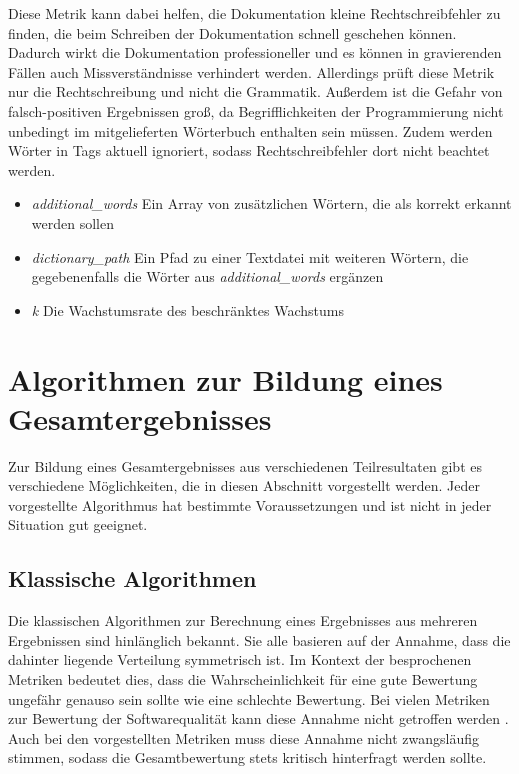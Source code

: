  Diese Metrik kann dabei helfen, die Dokumentation kleine Rechtschreibfehler zu finden, die beim Schreiben der Dokumentation schnell geschehen können. Dadurch wirkt die Dokumentation professioneller und es können in gravierenden Fällen auch Missverständnisse verhindert werden. Allerdings prüft diese Metrik nur die Rechtschreibung und nicht die Grammatik. Außerdem ist die Gefahr von falsch-positiven Ergebnissen groß, da Begrifflichkeiten der Programmierung nicht unbedingt im mitgelieferten Wörterbuch enthalten sein müssen. Zudem werden Wörter in Tags aktuell ignoriert, sodass Rechtschreibfehler dort nicht beachtet werden. 
 \begin{itemize}
    \item \textit{additional\_words} Ein Array von zusätzlichen Wörtern, die als korrekt erkannt werden sollen
     \item
    \textit{dictionary\_path} Ein Pfad zu einer Textdatei mit weiteren Wörtern, die gegebenenfalls die Wörter aus \textit{additional\_words} ergänzen
    \item \textit{k} Die Wachstumsrate des beschränktes Wachstums
   
  
 \end{itemize}  
 \section{Algorithmen zur Bildung eines Gesamtergebnisses}
Zur Bildung eines Gesamtergebnisses aus verschiedenen Teilresultaten gibt es verschiedene Möglichkeiten, die in diesen Abschnitt vorgestellt werden. Jeder vorgestellte Algorithmus hat bestimmte Voraussetzungen und ist nicht in jeder Situation gut geeignet.

\subsection{Klassische Algorithmen}
Die klassischen Algorithmen zur Berechnung eines Ergebnisses aus mehreren Ergebnissen sind hinlänglich bekannt. Sie alle basieren auf der Annahme, dass die dahinter liegende Verteilung symmetrisch ist. Im Kontext der besprochenen Metriken bedeutet dies, dass die Wahrscheinlichkeit für eine gute Bewertung ungefähr genauso sein sollte wie eine schlechte Bewertung. Bei vielen Metriken zur Bewertung der Softwarequalität kann diese Annahme nicht getroffen werden \cite[S. 313]{Youcantcontroltheunfamiliar:Astudyontherelationsbetweenaggregationtechniquesforsoftwaremetrics}. Auch bei den vorgestellten Metriken muss diese Annahme nicht zwangsläufig stimmen, sodass die Gesamtbewertung stets kritisch hinterfragt werden sollte. 
